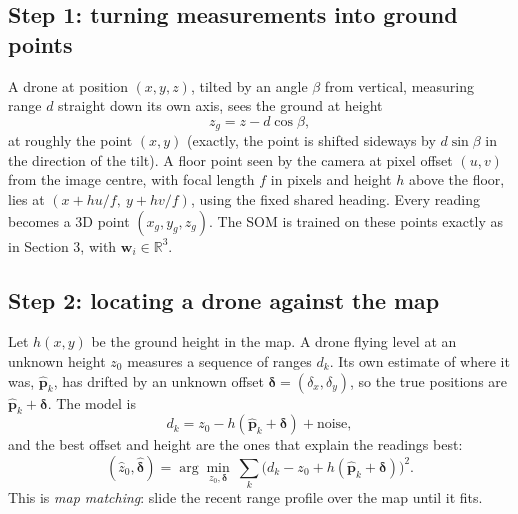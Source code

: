 \documentclass[11pt,a4paper]{article}
\newcommand{\vect}[1]{\mathbf{#1}}
\newcommand{\R}{\mathbb{R}}
\newcommand{\w}{\vect{w}}
\begin{document}
\subsection{Step 1: turning measurements into ground points}
A drone at position $(x,y,z)$, tilted by an angle $\beta$ from vertical, measuring range $d$ straight down its own
axis, sees the ground at height
\[
z_g=z-d\cos\beta ,
\]
at roughly the point $(x,y)$ (exactly, the point is shifted sideways by $d\sin\beta$ in the direction of the tilt).
A floor point seen by the camera at pixel offset $(u,v)$ from the image centre, with focal length $f$ in pixels and
height $h$ above the floor, lies at $(x+hu/f,\ y+hv/f)$, using the fixed shared heading. Every reading becomes a 3D
point $(x_g,y_g,z_g)$. The SOM is trained on these points exactly as in Section 3, with $\w_i\in\R^3$.

\subsection{Step 2: locating a drone against the map}
Let $h(x,y)$ be the ground height in the map. A drone flying level at an unknown height $z_0$ measures a sequence
of ranges $d_k$. Its own estimate of where it was, $\hat{\vect{p}}_k$, has drifted by an unknown offset
$\vect{\delta}=(\delta_x,\delta_y)$, so the true positions are $\hat{\vect{p}}_k+\vect{\delta}$. The model is
\[
d_k=z_0-h(\hat{\vect{p}}_k+\vect{\delta})+\text{noise},
\]
and the best offset and height are the ones that explain the readings best:
\begin{equation}
(\hat z_0,\hat{\vect{\delta}})=\arg\min_{z_0,\vect{\delta}}\ \sum_k\big(d_k-z_0+h(\hat{\vect{p}}_k+\vect{\delta})\big)^2 .
\label{eq:match}
\end{equation}
This is \emph{map matching}: slide the recent range profile over the map until it fits.
\end{document}
